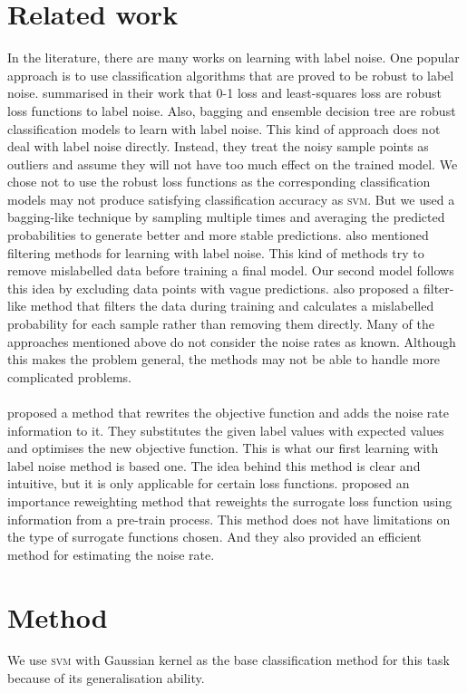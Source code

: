 \documentclass{article} %
\begin{document}
\section{Related work}
In the literature, there are many works on learning with label noise. One popular approach is to use classification algorithms that are proved to be robust to label noise. \cite{frenay2014classification} summarised in their work that 0-1 loss and least-squares loss are robust loss functions to label noise. Also, bagging and ensemble decision tree are robust classification models to learn with label noise. This kind of approach does not deal with label noise directly. Instead, they treat the noisy sample points as outliers and assume they will not have too much effect on the trained model. We chose not to use the robust loss functions as the corresponding classification models may not produce satisfying classification accuracy as \textsc{svm}. But we used a bagging-like technique by sampling multiple times and averaging the predicted probabilities to generate better and more stable predictions. \cite{frenay2014classification} also mentioned filtering methods for learning with label noise. This kind of methods try to remove mislabelled data before training a final model. Our second model follows this idea by excluding data points with vague predictions. \cite{yang2018adasampling} also proposed a filter-like method that filters the data during training and calculates a mislabelled probability for each sample rather than removing them directly. Many of the approaches mentioned above do not consider the noise rates as known. Although this makes the problem general, the methods may not be able to handle more complicated problems. \\ \\
\citet{pmlr-v20-biggio11} proposed a method that rewrites the objective function and adds the noise rate information to it. They substitutes the given label values with expected values and optimises the new objective function. This is what our first learning with label noise method is based one. The idea behind this method is clear and intuitive, but it is only applicable for certain loss functions. \citet{liu2016classification} proposed an importance reweighting method that reweights the surrogate loss function using information from a pre-train process. This method does not have limitations on the type of surrogate functions chosen. And they also provided an efficient method for estimating the noise rate. 

\section{Method}
We use \textsc{svm} with Gaussian kernel as the base classification method for this task because of its generalisation ability.
\end{document}
